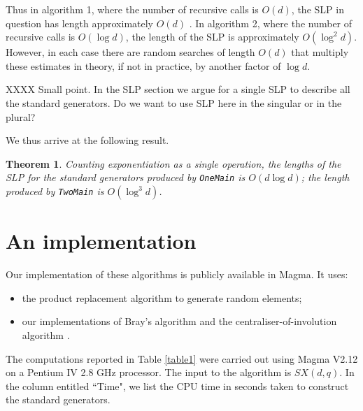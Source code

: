 \documentclass[12pt]{article}
\newtheorem{theorem}[definition]{Theorem}
\begin{document}
Thus in algorithm 1, where the number of recursive calls is $O(d)$, the
SLP in question has length approximately $O(d)$ .   In algorithm 2, where the number of recursive calls 
is $O(\log d)$, the length of the SLP  is approximately $O(\log^2 d)$.  However, in each case there
are random searches of length $O(d)$ that multiply these estimates in theory, if not in practice, by another factor of $\log d$.

XXXX  Small point.  In the SLP section we argue for a single SLP to describe all the standard 
generators.  Do we want to use SLP here in the singular or in the plural?

We thus arrive at the following result.
\begin{theorem} 
Counting exponentiation as a single operation, the lengths of the SLP for the standard generators produced by 
{\tt OneMain} is $O(d\log d)$; the length produced by {\tt TwoMain}
is $O(\log^3 d)$.
\end{theorem}

\section{An implementation}
Our implementation of these algorithms is publicly available in {\sc Magma}.
It uses:
\begin{itemize}
\item 
the product replacement algorithm \cite{Celleretal95}
to generate random elements; 
\item our implementations of Bray's algorithm \cite{Bray}
and the centraliser-of-involution algorithm \cite{Ryba}.
\end{itemize}

The computations reported in Table \ref{table1} were carried out
using {\sc Magma} V2.12 on a Pentium IV 2.8 GHz processor.
The input to the algorithm is $SX (d, q)$.
In the column entitled ``Time", we list the CPU time in seconds
taken to construct the standard generators.
\end{document}
